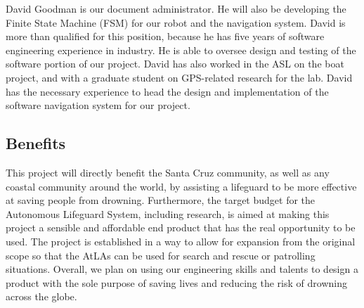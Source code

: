 \documentclass[11pt]{article}
\begin{document}
David Goodman is our document administrator. He will also be developing the Finite State Machine (FSM) for our robot and the navigation system. David is more than qualified for this position, because he has five years of software engineering experience in industry. He is able to oversee design and testing of the software portion of our project. David has also worked in the ASL on the boat project, and with a graduate student on GPS-related research for the lab. David has the necessary experience to head the design and implementation of the software navigation system for our project.

\subsection*{Benefits}

This project will directly benefit the Santa Cruz community, as well as any coastal community around the world, by assisting a lifeguard to be more effective at saving people from drowning. Furthermore, the target budget for the Autonomous Lifeguard System, including research, is aimed at making this project a sensible and affordable end product that has the real opportunity to be used. The project is established in a way to allow for expansion from the original scope so that the AtLAs can be used for search and rescue or patrolling situations. Overall, we plan on using our engineering skills and talents to design a product with the sole purpose of saving lives and reducing the risk of drowning across the globe.
\end{document}
